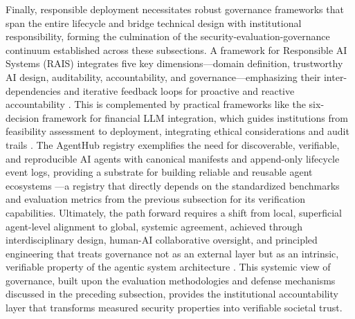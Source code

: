 \documentclass[11pt]{article}
\begin{document}
Finally, responsible deployment necessitates robust governance frameworks that span the entire lifecycle and bridge technical design with institutional responsibility, forming the culmination of the security-evaluation-governance continuum established across these subsections. A framework for Responsible AI Systems (RAIS) integrates five key dimensions---domain definition, trustworthy AI design, auditability, accountability, and governance---emphasizing their inter-dependencies and iterative feedback loops for proactive and reactive accountability \cite{ref484}. This is complemented by practical frameworks like the six-decision framework for financial LLM integration, which guides institutions from feasibility assessment to deployment, integrating ethical considerations and audit trails \cite{ref485}. The AgentHub registry exemplifies the need for discoverable, verifiable, and reproducible AI agents with canonical manifests and append-only lifecycle event logs, providing a substrate for building reliable and reusable agent ecosystems \cite{ref486}---a registry that directly depends on the standardized benchmarks and evaluation metrics from the previous subsection for its verification capabilities. Ultimately, the path forward requires a shift from local, superficial agent-level alignment to global, systemic agreement, achieved through interdisciplinary design, human-AI collaborative oversight, and principled engineering that treats governance not as an external layer but as an intrinsic, verifiable property of the agentic system architecture \cite{ref10,ref468}. This systemic view of governance, built upon the evaluation methodologies and defense mechanisms discussed in the preceding subsection, provides the institutional accountability layer that transforms measured security properties into verifiable societal trust.
\end{document}
